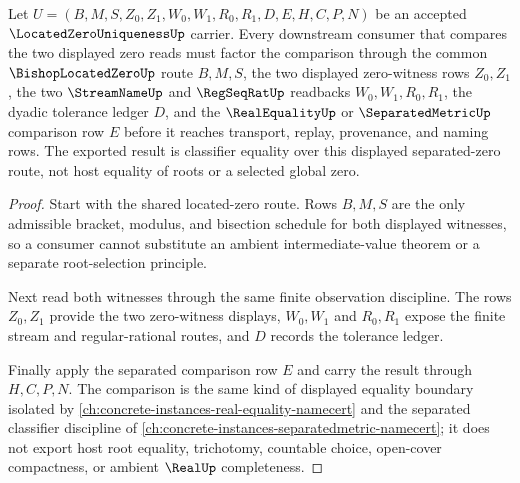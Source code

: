 \begin{theorem}
\label{thm:located-zero-uniqueness-separation-envelope}
Let $U=(B,M,S,Z_0,Z_1,W_0,W_1,R_0,R_1,D,E,H,C,P,N)$ be an accepted $\LocatedZeroUniquenessUp$ carrier. Every downstream consumer that compares the two displayed zero reads must factor the comparison through the common $\BishopLocatedZeroUp$ route $B,M,S$, the two displayed zero-witness rows $Z_0,Z_1$, the two $\StreamNameUp$ and $\RegSeqRatUp$ readbacks $W_0,W_1,R_0,R_1$, the dyadic tolerance ledger $D$, and the $\RealEqualityUp$ or $\SeparatedMetricUp$ comparison row $E$ before it reaches transport, replay, provenance, and naming rows. The exported result is classifier equality over this displayed separated-zero route, not host equality of roots or a selected global zero.
\end{theorem}
\begin{proof}
Start with the shared located-zero route. Rows $B,M,S$ are the only admissible bracket, modulus, and bisection schedule for both displayed witnesses, so a consumer cannot substitute an ambient intermediate-value theorem or a separate root-selection principle.

Next read both witnesses through the same finite observation discipline. The rows $Z_0,Z_1$ provide the two zero-witness displays, $W_0,W_1$ and $R_0,R_1$ expose the finite stream and regular-rational routes, and $D$ records the tolerance ledger.

Finally apply the separated comparison row $E$ and carry the result through $H,C,P,N$. The comparison is the same kind of displayed equality boundary isolated by \autoref{ch:concrete-instances-real-equality-namecert} and the separated classifier discipline of \autoref{ch:concrete-instances-separatedmetric-namecert}; it does not export host root equality, trichotomy, countable choice, open-cover compactness, or ambient $\RealUp$ completeness.
\end{proof}



